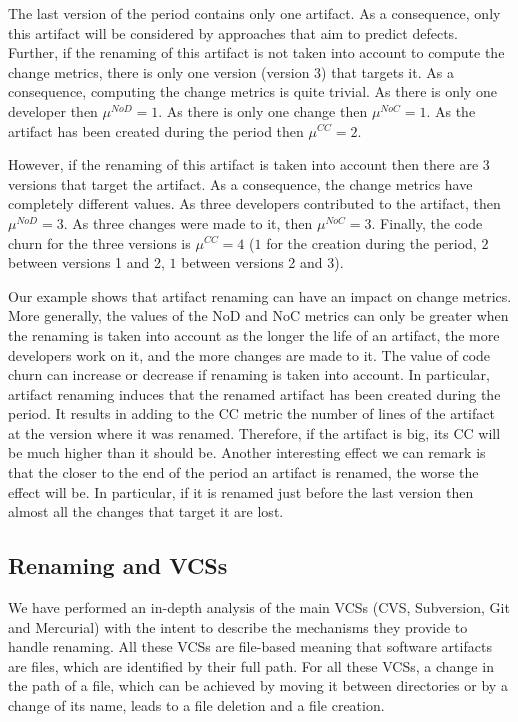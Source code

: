 The last version of the period contains only one artifact. As a consequence, only this artifact will be considered by approaches that aim to predict defects. Further, if the renaming of this artifact is not taken into account to compute the change metrics, there is only one version (version 3) that targets it. As a consequence, computing the change metrics is quite trivial. As there is only one developer then $\mu^{NoD}=1$. As there is only one change then $\mu^{NoC}=1$. As the artifact has been created during the period then $\mu^{CC}=2$.

However, if the renaming of this artifact is taken into account then there are $3$ versions that target the artifact. As a consequence, the change metrics have completely different values. As three developers contributed to the artifact, then $\mu^{NoD}=3$. As three changes were made to it, then $\mu^{NoC}=3$. Finally, the code churn for the three versions is $\mu^{CC}=4$ ($1$ for the creation during the period, $2$ between versions 1 and 2, $1$ between versions 2 and 3).

Our example shows that artifact renaming can have an impact on change metrics. More generally, the values of the NoD and NoC metrics can only be greater when the renaming is taken into account as the longer the life of an artifact, the more developers work on it, and the more changes are made to it. The value of code churn can increase or decrease if renaming is taken into account. In particular, artifact renaming induces that the renamed artifact has been created during the period. It results in adding to the CC metric the number of lines of the artifact at the version where it was renamed. Therefore, if the artifact is big, its CC will be much higher than it should be. Another interesting effect we can remark is that the closer to the end of the period an artifact is renamed, the worse the effect will be. In particular, if it is renamed just before the last version then almost all the changes that target it are lost.

\subsection{Renaming and VCSs}

We have performed an in-depth analysis of the main VCSs (CVS, Subversion, Git and Mercurial) with the intent to describe the mechanisms they provide to handle renaming. All these VCSs are file-based meaning that software artifacts are files, which are identified by their full path. For all these VCSs, a change in the path of a file, which can be achieved by moving it between directories or by a change of its name, leads to a file deletion and a file creation.

